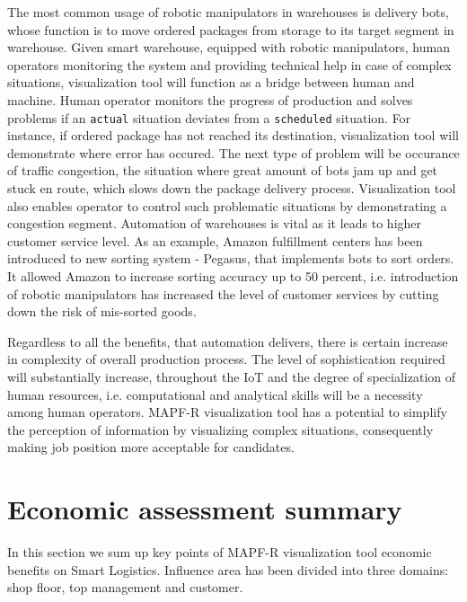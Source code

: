 \documentclass[thesis=B,english]{FITthesis}[2019/12/23]
\begin{document}
The most common usage of robotic manipulators in warehouses is delivery bots, whose function is to move ordered packages from storage to its target segment in warehouse. Given smart warehouse, equipped with robotic manipulators, human operators monitoring the system and providing technical help in case of complex situations, visualization tool will function as a bridge between human and machine. Human operator monitors the progress of production and solves problems if an \verb|actual| situation deviates from a \verb|scheduled| situation. For instance, if ordered package has not reached its destination, visualization tool will demonstrate where error has occured. The next type of problem will be occurance of traffic congestion, the situation where great amount of bots jam up and get stuck en route, which slows down the package delivery process. Visualization tool also enables operator to control such problematic situations by demonstrating a congestion segment. Automation of warehouses is vital as it leads to higher customer service level. As an example, Amazon fulfillment centers has been introduced to new sorting system - Pegasus, that implements bots to sort orders. It allowed Amazon to increase sorting accuracy up to 50 percent, i.e. introduction of robotic manipulators has increased the level of customer services by cutting down the risk of mis-sorted goods.   

Regardless to all the benefits, that automation delivers, there is certain increase in complexity of overall production process. The level of sophistication required will substantially increase, throughout the IoT and the degree of specialization
of human resources, i.e. computational and analytical skills will be a necessity among human operators. MAPF-R visualization tool has a potential to simplify the perception of information by visualizing complex situations, consequently making job position more acceptable for candidates.



\section{Economic assessment summary}

In this section we sum up key points of MAPF-R visualization tool economic benefits
on Smart Logistics. Influence area has been divided into three domains: shop floor, top management and customer.
\end{document}
